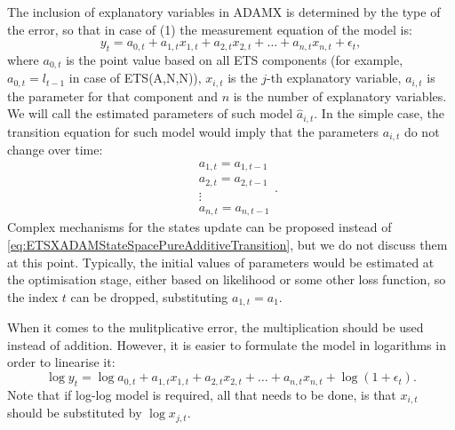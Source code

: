 \documentclass[
]{book}
\theoremstyle{definition}
\theoremstyle{definition}
\theoremstyle{definition}
\theoremstyle{definition}
\theoremstyle{remark}
\begin{document}
The inclusion of explanatory variables in ADAMX is determined by the type of the error, so that in case of (1) the measurement equation of the model is:
\begin{equation}
  {y}_{t} = a_{0,t} + a_{1,t} x_{1,t} + a_{2,t} x_{2,t} + \dots + a_{n,t} x_{n,t} + \epsilon_t ,
  \label{eq:ETSXADAMStateSpacePureAdditiveMeasurement}
\end{equation}
where \(a_{0,t}\) is the point value based on all ETS components (for example, \(a_{0,t}=l_{t-1}\) in case of ETS(A,N,N)), \(x_{i,t}\) is the \(j\)-th explanatory variable, \(a_{i,t}\) is the parameter for that component and \(n\) is the number of explanatory variables. We will call the estimated parameters of such model \(\hat{a}_{i,t}\). In the simple case, the transition equation for such model would imply that the parameters \(a_{i,t}\) do not change over time:
\begin{equation}
  \begin{aligned}
    &a_{1,t} = a_{1,t-1} \\
    &a_{2,t} = a_{2,t-1} \\
    &\vdots \\
    &a_{n,t} = a_{n,t-1}
  \end{aligned} .
  \label{eq:ETSXADAMStateSpacePureAdditiveTransition}
\end{equation}
Complex mechanisms for the states update can be proposed instead of \eqref{eq:ETSXADAMStateSpacePureAdditiveTransition}, but we do not discuss them at this point. Typically, the initial values of parameters would be estimated at the optimisation stage, either based on likelihood or some other loss function, so the index \(t\) can be dropped, substituting \(a_{1,t}=a_{1}\).

When it comes to the mulitplicative error, the multiplication should be used instead of addition. However, it is easier to formulate the model in logarithms in order to linearise it:
\begin{equation}
  \log {y}_{t} = \log a_{0,t} + a_{1,t} x_{1,t} + a_{2,t} x_{2,t} + \dots + a_{n,t} x_{n,t} + \log(1+ \epsilon_t).
  \label{eq:ETSXADAMStateSpacePureAdditiveMeasurement}
\end{equation}
Note that if log-log model is required, all that needs to be done, is that \(x_{i,t}\) should be substituted by \(\log x_{j,t}\).
\end{document}
